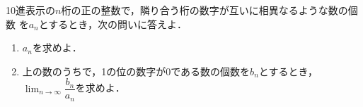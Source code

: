 \documentclass[../../main.tex]{subfiles}
\begin{document}
10進表示の$n$桁の正の整数で，隣り合う桁の数字が互いに相異なるような数の個数 を$a_n$とするとき，次の問いに答えよ．
\begin{enumerate}
  \item $a_n$を求めよ．
  \item 上の数のうちで，1の位の数字が0である数の個数を$b_n$とするとき，$ \lim_{n \to \infty} \dfrac{b_n}{a_n}$を求めよ．
\end{enumerate}
\end{document}
